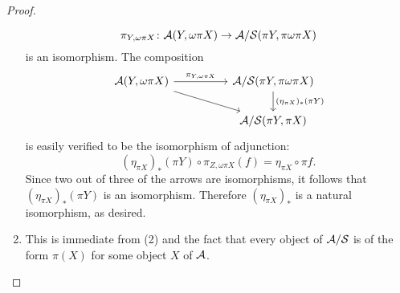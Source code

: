\documentclass[dissertation.tex]{subfiles}
\begin{document}
\begin{lem}
\begin{proof}
\begin{enumerate}
      $$\pi_{Y,\omega\pi{X}} \colon \mathcal{A}(Y,\omega\pi{X}) \to \mathcal{A}/\mathcal{S}(\pi{Y}, \pi\omega\pi{X})$$
      is an isomorphism.
      The composition
      $$\begin{tikzcd}[column sep=huge]
        \A(Y, \omega\pi{X}) \arrow{r}{\pi_{Y,\omega\pi{X}}} \arrow{rd} & \A/\mathcal{S}(\pi{Y}, \pi\omega\pi{X}) \arrow{d}{(\eta_{\pi{X}})_\ast(\pi{Y})}\\
        & \A/\mathcal{S}(\pi{Y}, \pi{X})
      \end{tikzcd}$$
      is easily verified to be the isomorphism of adjunction:
      $$(\eta_{\pi{X}})_\ast(\pi{Y}) \circ\pi_{Z,\omega\pi{X}}(f) = \eta_{\pi{X}} \circ \pi{f}.$$
      Since two out of three of the arrows are isomorphisms, it follows that $(\eta_{\pi{X}})_\ast(\pi{Y})$ is an isomorphism.
      Therefore $(\eta_{\pi{X}})_\ast$ is a natural isomorphism, as desired.
    \item
      This is immediate from (2) and the fact that every object of $\mathcal{A}/\mathcal{S}$ is of the form $\pi(X)$ for some object $X$ of $\mathcal{A}$.
    \end{enumerate}
  \end{proof}
\end{lem}

\end{document}
